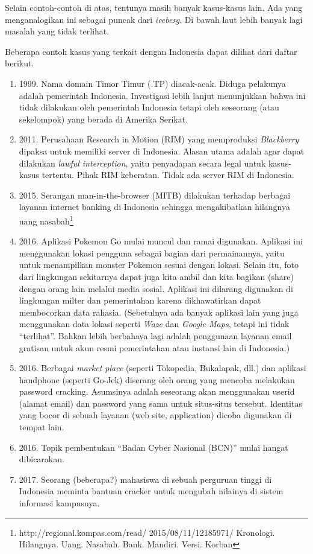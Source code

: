 Selain contoh-contoh di atas, tentunya masih banyak kasus-kasus lain.
Ada yang menganalogikan ini sebagai puncak dari {\em iceberg}.
Di bawah laut lebih banyak lagi masalah yang tidak terlihat.

Beberapa contoh kasus yang terkait dengan Indonesia dapat
dilihat dari daftar berikut.

\begin{enumerate}
\item 1999. Nama domain Timor Timur (.TP) diacak-acak.
   Diduga pelakunya adalah pemerintah Indonesia.
   Investigasi lebih lanjut menunjukkan bahwa ini tidak dilakukan
   oleh pemerintah Indonesia tetapi oleh seseorang (atau sekelompok)
   yang berada di Amerika Serikat.
\item 2011. Perusahaan Research in Motion (RIM) yang memproduksi
   {\em Blackberry} dipaksa untuk memiliki server di Indonesia.
   Alasan utama adalah agar dapat dilakukan {\em lawful interception},
   yaitu penyadapan secara legal untuk kasus-kasus tertentu.
   Pihak RIM keberatan. Tidak ada server RIM di Indonesia.
\item 2015. Serangan man-in-the-browser (MITB) dilakukan terhadap
   berbagai layanan internet banking di Indonesia sehingga mengakibatkan
   hilangnya uang nasabah\footnote{http://regional.kompas.com/read/
   2015/08/11/12185971/
   Kronologi. Hilangnya. Uang. Nasabah. Bank. Mandiri.
   Versi. Korban}
\item 2016. Aplikasi Pokemon Go mulai muncul dan ramai digunakan.
   Aplikasi ini menggunakan lokasi pengguna sebagai bagian dari
   permainannya, yaitu untuk menampilkan monster Pokemon sesuai
   dengan lokasi.
   Selain itu, foto dari lingkungan sekitarnya dapat juga kita ambil
   dan kita bagikan (share) dengan orang lain melalui media sosial.
   Aplikasi ini dilarang digunakan di lingkungan milter dan
   pemerintahan karena dikhawatirkan dapat membocorkan data rahasia.
   (Sebetulnya ada banyak aplikasi lain yang juga menggunakan data
   lokasi seperti {\em Waze} dan {\em Google Maps}, tetapi ini tidak
   ``terlihat''. Bahkan lebih berbahaya lagi adalah penggunaan
   layanan email gratisan untuk akun resmi pemerintahan atau instansi
   lain di Indonesia.)
\item 2016.
   Berbagai {\em market place} (seperti Tokopedia, Bukalapak, dll.)
   dan aplikasi handphone (seperti Go-Jek) diserang oleh orang
   yang mencoba melakukan password cracking.
   Asumsinya adalah seseorang akan menggunakan userid (alamat email)
   dan password yang sama untuk situs-situs tersebut.
   Identitas yang bocor di sebuah layanan (web site, application)
   dicoba digunakan di tempat lain. 
\item 2016. Topik pembentukan ``Badan Cyber Nasional (BCN)''
   mulai hangat dibicarakan.
\item 2017. Seorang (beberapa?) mahasiswa di sebuah perguruan tinggi
   di Indonesia meminta bantuan cracker untuk mengubah nilainya di
   sistem informasi kampusnya.
\end{enumerate}

